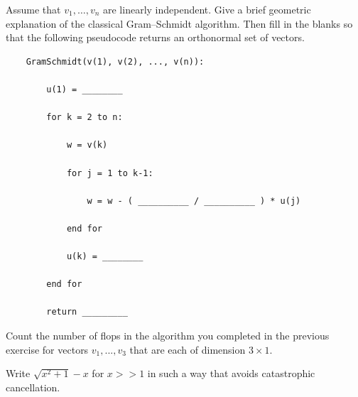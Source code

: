 \documentclass{ximera}
\begin{document}
\newpage

\begin{exercise}
    Assume that $v_1,\ldots,v_n$ are linearly independent.
    Give a brief geometric explanation of the classical
    Gram--Schmidt algorithm. Then fill in the blanks so that
    the following pseudocode returns an orthonormal set of vectors.
\begin{verbatim}
    GramSchmidt(v(1), v(2), ..., v(n)):

        u(1) = ________

        for k = 2 to n:

            w = v(k)

            for j = 1 to k-1:

                w = w - ( __________ / __________ ) * u(j)

            end for

            u(k) = ________

        end for

        return _________
\end{verbatim}
\end{exercise}


\begin{exercise}
    Count the number of flops in the algorithm you completed in the previous exercise for vectors $v_1, ..., v_3$ that are each of dimension $3\times 1$.
\end{exercise}

\begin{exercise}
    Write $\sqrt{x^2+1} -x$ for $x >> 1$  in such a way that avoids catastrophic cancellation.
\end{exercise}
\end{document}
